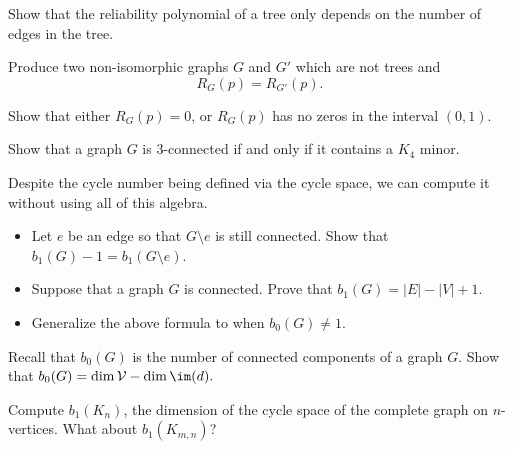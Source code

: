 \begin{exercise}
Show that the reliability polynomial of a tree only depends on the number of edges in the tree. 
\label{exer:reliabilitytree}
\end{exercise}

\begin{exercise}
Produce two non-isomorphic graphs $G$ and $G'$ which are not trees and \[R_G(p)=R_{G'}(p).\]
\label{exer:reliabilitynonisomoprhic}
\end{exercise}
\begin{exercise}
Show that either $R_G(p)=0$, or $R_G(p)$ has no zeros in the interval $(0,1)$.
\label{exer:reliabilityzero}
\end{exercise} 
\begin{exercise}
	Show that a graph $G$ is 3-connected if and only if it contains a $K_4$ minor. 
	\label{exer:tuttestheorem}
\end{exercise}
\begin{exercise} 
Despite the cycle number being defined via the cycle space, we can compute it without using all of this algebra. 
\begin{itemize}
\item Let $e$ be an edge so that $G\setminus e$ is still connected. Show that $b_1(G)-1=b_1(G\setminus e)$. 
\item Suppose that a graph $G$ is connected. Prove that $b_1(G)=|E|-|V|+1$. 
\item Generalize the above formula to when $b_0(G)\neq 1$. 
\end{itemize}
\label{exer:simpleb1}
\end{exercise}

\begin{exercise}
Recall that $b_0(G)$ is the number of connected components of a graph $G$. Show that $b_0(G)=\dim \mathcal V - \dim \im(d).$\label{exer:simpleb0}
\end{exercise}

\begin{exercise}
Compute $b_1(K_n)$, the dimension of the cycle space of the complete graph on $n$-vertices. What about $b_1(K_{m,n})$?
\label{exer:b0kn}
\end{exercise}
